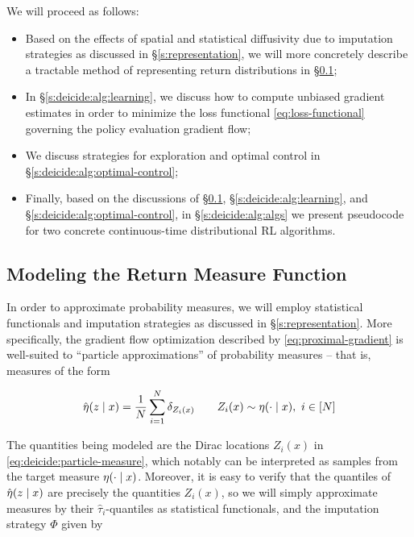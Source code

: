We will proceed as follows:
\begin{itemize}
  \item Based on the effects of spatial and statistical diffusivity due to
    imputation strategies as discussed in \S\ref{s:representation}, we will
    more concretely describe a tractable method of representing return
    distributions in \S\ref{s:deicide:alg:representation};
  \item In \S\ref{s:deicide:alg:learning}, we discuss how to compute unbiased
    gradient estimates in order to minimize the loss functional
    \eqref{eq:loss-functional} governing the policy evaluation gradient flow;
  \item We discuss strategies for exploration and optimal control in
    \S\ref{s:deicide:alg:optimal-control};
  \item Finally, based on the discussions of
    \S\ref{s:deicide:alg:representation}, \S\ref{s:deicide:alg:learning}, and
    \S\ref{s:deicide:alg:optimal-control}, in \S\ref{s:deicide:alg:algs} we
    present pseudocode for two concrete continuous-time distributional RL
    algorithms.
\end{itemize}

\subsection{Modeling the Return Measure
  Function}\label{s:deicide:alg:representation}
In order to approximate probability measures, we will employ
statistical functionals and imputation strategies as discussed in
\S\ref{s:representation}. More specifically, the gradient flow
optimization described by \eqref{eq:proximal-gradient} is
well-suited to ``particle approximations'' of probability measures --
that is, measures of the form

\begin{equation}
  \label{eq:deicide:particle-measure}
  \hat{\operatorname{\eta}}(z\mid x) =
  \frac{1}{N}\sum_{i=1}^N\delta_{Z_i(x)}\qquad
  Z_i(x)\sim\operatorname{\eta}(\cdot\mid x),\ i\in [N]
\end{equation}

The quantities being modeled are the Dirac locations $Z_i(x)$ in
\eqref{eq:deicide:particle-measure}, which notably can be interpreted as
samples from the target measure $\operatorname{\eta}(\cdot\mid
x)$. Moreover, it is easy to verify that the quantiles of
$\hat{\operatorname{\eta}}(z\mid x)$ are precisely the quantities $Z_i(x)$,
so we will simply approximate measures by their $\hat\tau_i$-quantiles
as statistical functionals, and the imputation strategy $\Phi$ given by


